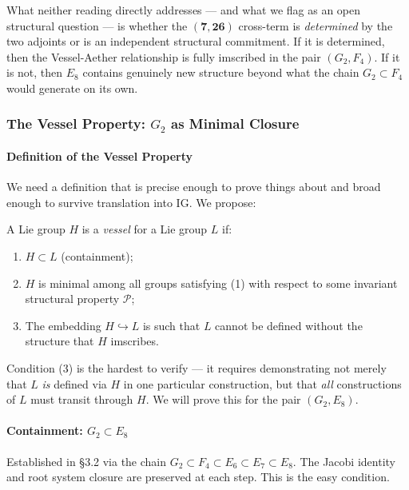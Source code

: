 \documentclass[12pt,a4paper]{article}
\newcommand{\pilcrow}{\S}
\begin{document}
What neither reading directly addresses --- and what we flag as an open structural question --- is whether the $(\mathbf{7}, \mathbf{26})$ cross-term is \emph{determined} by the two adjoints or is an independent structural commitment. If it is determined, then the Vessel-Aether relationship is fully imscribed in the pair $(G_2, F_4)$. If it is not, then $E_8$ contains genuinely new structure beyond what the chain $G_2 \subset F_4$ would generate on its own.

\subsubsection{The Vessel Property: $G_2$ as Minimal Closure}

\paragraph{Definition of the Vessel Property}

We need a definition that is precise enough to prove things about and broad enough to survive translation into IG. We propose:

A Lie group $H$ is a \emph{vessel} for a Lie group $L$ if:

\begin{enumerate}
    \item $H \subset L$ (containment);
    \item $H$ is minimal among all groups satisfying (1) with respect to some invariant structural property $\mathcal{P}$;
    \item The embedding $H \hookrightarrow L$ is such that $L$ cannot be defined without the structure that $H$ imscribes.
\end{enumerate}

Condition (3) is the hardest to verify --- it requires demonstrating not merely that $L$ \emph{is} defined via $H$ in one particular construction, but that \emph{all} constructions of $L$ must transit through $H$. We will prove this for the pair $(G_2, E_8)$.

\paragraph{Containment: $G_2 \subset E_8$}

Established in \pilcrow{}3.2 via the chain $G_2 \subset F_4 \subset E_6 \subset E_7 \subset E_8$. The Jacobi identity and root system closure are preserved at each step. This is the easy condition.
\end{document}
